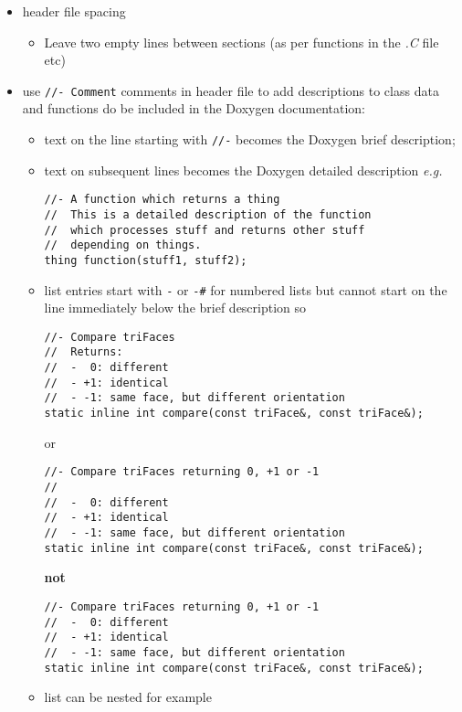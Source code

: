 \documentclass[11pt]{article}
\begin{document}
\begin{itemize}
\item header file spacing
\begin{itemize}
\item Leave two empty lines between sections
        (as per functions in the \emph{.C} file etc)
\end{itemize}
\item use \texttt{//- Comment} comments in header file to add descriptions to class
      data and functions do be included in the Doxygen documentation:
\begin{itemize}
\item text on the line starting with \texttt{//-} becomes the Doxygen brief
        description;
\item text on subsequent lines becomes the Doxygen detailed description \emph{e.g.}

\begin{verbatim}
//- A function which returns a thing
//  This is a detailed description of the function
//  which processes stuff and returns other stuff
//  depending on things.
thing function(stuff1, stuff2);
\end{verbatim}
\item list entries start with \texttt{-} or \texttt{-\#} for numbered lists but cannot start
        on the line immediately below the brief description so

\begin{verbatim}
//- Compare triFaces
//  Returns:
//  -  0: different
//  - +1: identical
//  - -1: same face, but different orientation
static inline int compare(const triFace&, const triFace&);
\end{verbatim}
        or

\begin{verbatim}
//- Compare triFaces returning 0, +1 or -1
//
//  -  0: different
//  - +1: identical
//  - -1: same face, but different orientation
static inline int compare(const triFace&, const triFace&);
\end{verbatim}
        \textbf{not}

\begin{verbatim}
//- Compare triFaces returning 0, +1 or -1
//  -  0: different
//  - +1: identical
//  - -1: same face, but different orientation
static inline int compare(const triFace&, const triFace&);
\end{verbatim}
\item list can be nested for example


\end{itemize}
\end{itemize}
\end{document}
